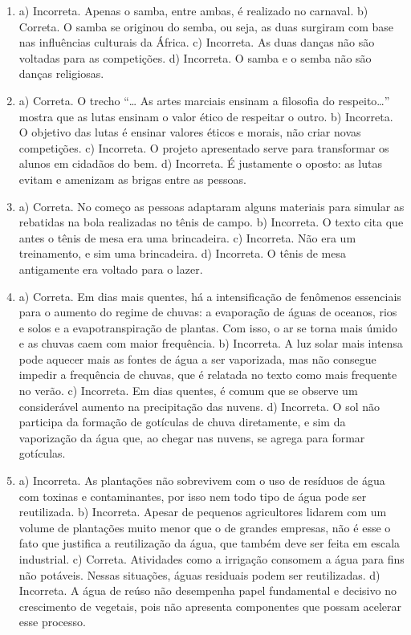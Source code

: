 \begin{enumerate}
\item
a) Incorreta. Apenas o samba, entre ambas, é realizado no carnaval.
b) Correta. O samba se originou do semba, ou seja, as duas
surgiram com base nas influências culturais da África.
c) Incorreta. As duas danças não são voltadas para as
competições.
d) Incorreta. O samba e o semba não são danças religiosas.

\item
a) Correta. O trecho “\ldots{} As artes marciais ensinam a filosofia
do respeito\ldots{}” mostra que as lutas ensinam o valor ético de respeitar
o outro.
b) Incorreta. O objetivo das lutas é ensinar valores éticos e
morais, não criar novas competições.
c) Incorreta. O projeto apresentado serve para transformar os alunos
em cidadãos do bem.
d) Incorreta. É justamente o oposto: as lutas
evitam e amenizam as brigas entre as pessoas.

\item
a) Correta. No começo as pessoas adaptaram alguns materiais para
simular as rebatidas na bola realizadas no tênis de campo.
b) Incorreta. O texto cita que antes o tênis de mesa era uma
brincadeira.
c) Incorreta. Não era um treinamento, e sim uma brincadeira.
d) Incorreta. O tênis de mesa antigamente era voltado para o
lazer.

\item
a) Correta. Em dias mais quentes, há a intensificação de fenômenos
essenciais para o aumento do regime de chuvas: a evaporação de águas de
oceanos, rios e solos e a evapotranspiração de plantas. Com isso, o ar
se torna mais úmido e as chuvas caem com maior frequência.
b) Incorreta. A luz solar mais intensa pode aquecer mais as fontes de
água a ser vaporizada, mas não consegue impedir a frequência de chuvas,
que é relatada no texto como mais frequente no verão.
c) Incorreta. Em dias quentes, é comum que se observe um considerável
aumento na precipitação das nuvens.
d) Incorreta. O sol não participa da formação de gotículas de chuva
diretamente, e sim da vaporização da água que, ao chegar nas nuvens, se
agrega para formar gotículas.

\item
a) Incorreta. As plantações não sobrevivem com o uso de resíduos de água
com toxinas e contaminantes, por isso nem todo tipo de água pode ser
reutilizada.
b) Incorreta. Apesar de pequenos agricultores lidarem com um volume de
plantações muito menor que o de grandes empresas, não é esse o fato que
justifica a reutilização da água, que também deve ser feita em escala
industrial.
c) Correta. Atividades como a irrigação consomem a água para fins
não potáveis. Nessas situações, águas residuais podem ser reutilizadas.
d) Incorreta. A água de reúso não desempenha papel fundamental e
decisivo no crescimento de vegetais, pois não apresenta componentes que
possam acelerar esse processo.


\end{enumerate}
